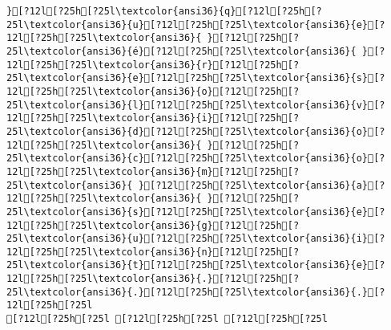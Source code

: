\documentclass{scrartcl}
\begin{document}
\begin{Verbatim}
}[?12l[?25h[?25l\textcolor{ansi36}{q}[?12l[?25h[?25l\textcolor{ansi36}{u}[?12l[?25h[?25l\textcolor{ansi36}{e}[?12l[?25h[?25l\textcolor{ansi36}{ }[?12l[?25h[?25l\textcolor{ansi36}{é}[?12l[?25h[?25l\textcolor{ansi36}{ }[?12l[?25h[?25l\textcolor{ansi36}{r}[?12l[?25h[?25l\textcolor{ansi36}{e}[?12l[?25h[?25l\textcolor{ansi36}{s}[?12l[?25h[?25l\textcolor{ansi36}{o}[?12l[?25h[?25l\textcolor{ansi36}{l}[?12l[?25h[?25l\textcolor{ansi36}{v}[?12l[?25h[?25l\textcolor{ansi36}{i}[?12l[?25h[?25l\textcolor{ansi36}{d}[?12l[?25h[?25l\textcolor{ansi36}{o}[?12l[?25h[?25l\textcolor{ansi36}{ }[?12l[?25h[?25l\textcolor{ansi36}{c}[?12l[?25h[?25l\textcolor{ansi36}{o}[?12l[?25h[?25l\textcolor{ansi36}{m}[?12l[?25h[?25l\textcolor{ansi36}{ }[?12l[?25h[?25l\textcolor{ansi36}{a}[?12l[?25h[?25l\textcolor{ansi36}{ }[?12l[?25h[?25l\textcolor{ansi36}{s}[?12l[?25h[?25l\textcolor{ansi36}{e}[?12l[?25h[?25l\textcolor{ansi36}{g}[?12l[?25h[?25l\textcolor{ansi36}{u}[?12l[?25h[?25l\textcolor{ansi36}{i}[?12l[?25h[?25l\textcolor{ansi36}{n}[?12l[?25h[?25l\textcolor{ansi36}{t}[?12l[?25h[?25l\textcolor{ansi36}{e}[?12l[?25h[?25l\textcolor{ansi36}{.}[?12l[?25h[?25l\textcolor{ansi36}{.}[?12l[?25h[?25l\textcolor{ansi36}{.}[?12l[?25h[?25l
[?12l[?25h[?25l [?12l[?25h[?25l [?12l[?25h[?25l

\end{Verbatim}
\end{document}
